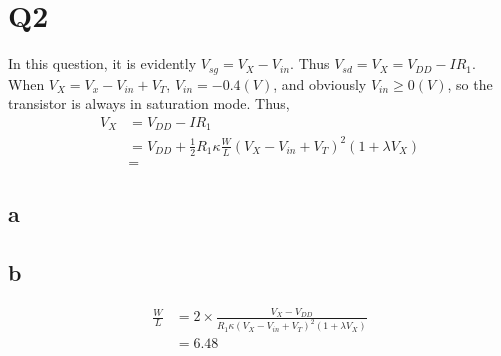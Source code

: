 \documentclass[a4paper,10pt]{article}
\begin{document}
\section*{Q2}
In this question, it is evidently \begin{math}V_{sg} = V_X - V_{in}\end{math}. 
Thus \begin{math}V_{sd} = V_X = V_{DD} - IR_1\end{math}. When \begin{math}V_X = V_x - V_{in} + V_T\end{math},
\begin{math}V_{in} = -0.4(V)\end{math}, and obviously \begin{math}V_{in} \geq 0(V)\end{math}, so the transistor is always
in saturation mode.
Thus, 
\begin{equation}
\begin{split}
V_X &= V_{DD} - IR_1\\
    &= V_{DD} + \frac{1}{2}R_1 \kappa\frac{W}{L}(V_X - V_{in} + V_T)^2 (1 + \lambda V_X)\\
    &=
\end{split}
\end{equation}
\subsection*{a}
\subsection*{b}
\begin{equation}
 \begin{split}
  \frac{W}{L} &= 2\times\frac{V_X - V_{DD}}{R_1 \kappa (V_X - V_{in} + V_T)^2 (1 + \lambda V_X)}\\
              &= 6.48
 \end{split}
\end{equation}
\end{document}
